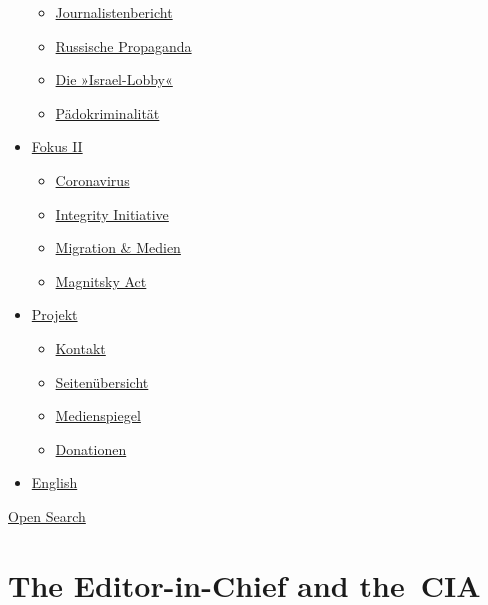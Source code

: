 \begin{itemize}
  \begin{itemize}
  \tightlist
  \item
    \href{https://swprs.org/bericht-eines-journalisten/}{Journalistenbericht}
  \item
    \href{https://swprs.org/russische-propaganda/}{Russische Propaganda}
  \item
    \href{https://swprs.org/die-israel-lobby-fakten-und-mythen/}{Die
    »Israel-Lobby«}
  \item
    \href{https://swprs.org/geopolitik-und-paedokriminalitaet/}{Pädokriminalität}
  \end{itemize}
\item
  \href{https://swprs.org/migration-und-medien/}{Fokus II}

  \begin{itemize}
  \tightlist
  \item
    \href{https://swprs.org/covid-19-hinweis-ii/}{Coronavirus}
  \item
    \href{https://swprs.org/die-integrity-initiative/}{Integrity
    Initiative}
  \item
    \href{https://swprs.org/migration-und-medien/}{Migration \& Medien}
  \item
    \href{https://swprs.org/der-fall-magnitsky/}{Magnitsky Act}
  \end{itemize}
\item
  \href{https://swprs.org/kontakt/}{Projekt}

  \begin{itemize}
  \tightlist
  \item
    \href{https://swprs.org/kontakt/}{Kontakt}
  \item
    \href{https://swprs.org/uebersicht/}{Seitenübersicht}
  \item
    \href{https://swprs.org/medienspiegel/}{Medienspiegel}
  \item
    \href{https://swprs.org/donationen/}{Donationen}
  \end{itemize}
\item
  \href{https://swprs.org/contact/}{English}
\end{itemize}

\protect\hyperlink{}{Open Search}

\hypertarget{the-editor-in-chief-and-the-cia}{%
\section{The Editor-in-Chief and
the~CIA}\label{the-editor-in-chief-and-the-cia}}

